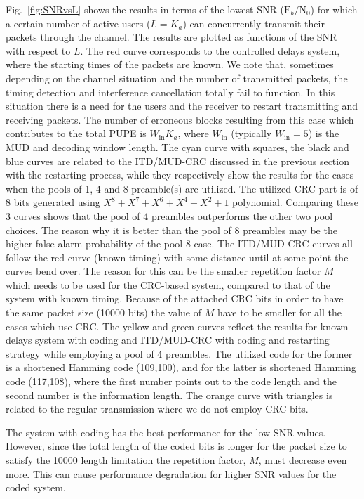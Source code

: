 \documentclass[journal,onecolumn,12pt]{IEEEtran}
\begin{document}
Fig.~\ref{fig:SNRvsL} shows the results in terms of the lowest SNR ($\textrm{E}_b/\textrm{N}_0$) for which a certain number of active users ($L=K_a$) can concurrently transmit their packets through the channel. The results are plotted as functions of the SNR with respect to $L$. The red curve corresponds to the controlled delays system, where the starting times of the packets are known. We note that, sometimes depending on the channel situation and the number of transmitted packets, the timing detection and interference cancellation totally fail to function. In this situation there is a need for the users and the receiver to restart transmitting and receiving packets. The number of erroneous blocks resulting from this case which contributes to the total PUPE is $W_{\text{in}}K_a$, where $W_{\text{in}}$ (typically $W_{\text{in}}=5$) is the MUD and decoding window length.
The cyan curve with squares, the black and blue curves are related to the ITD/MUD-CRC discussed in the previous section with the restarting process, while they respectively show the results for the cases when the pools of 1, 4 and 8 preamble(s) are utilized. The utilized CRC part is of 8 bits generated using $X^8+X^7+X^6+X^4+X^2+1$ polynomial. Comparing these 3 curves shows that the pool of 4 preambles outperforms the other two pool choices. The reason why it is better than the pool of 8 preambles may be the higher false alarm probability of the pool 8 case. The ITD/MUD-CRC curves all follow the red curve (known timing) with some distance until at some point the curves bend over. The reason for this can be the smaller repetition factor $M$ which needs to be used for the CRC-based system, compared to that of the system with known timing. Because of the attached CRC bits in order to have the same packet size (10000 bits) the value of $M$ have to be smaller for all the cases which use CRC.
The yellow and green curves reflect the results for known delays system with coding and ITD/MUD-CRC with coding and restarting strategy while employing a pool of 4 preambles. The utilized code for the former is a shortened Hamming code (109,100), and for the latter is shortened Hamming code (117,108), where the first number points out to the code length and the second number is the information length. The orange curve with triangles is related to the regular transmission where we do not employ CRC bits.

The system with coding has the best performance for the low SNR values. However, since the total length of the coded bits is longer for the packet size to satisfy the 10000 length limitation the repetition factor, $M$, must decrease even more. This can cause performance degradation for higher SNR values for the coded system.
\end{document}
